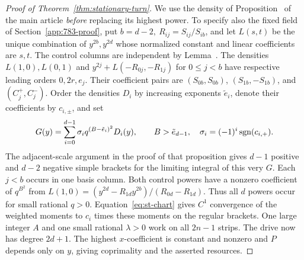 \begin{proof}[Proof of Theorem~\ref{thm:stationary-turn}]
We use the density of Proposition~ of the main article \emph{before} replacing its highest power. To specify also the fixed field of Section~\ref{app:783-proof}, put \(b=d-2,\ R_{ij}=S_{ij}/S_{ib}\), and let \(L(s,t)\) be the unique combination of \(y^{2b},y^{2d}\) whose normalized constant and linear coefficients are \(s,t\). The control columns are independent by Lemma~. The densities \(L(1,0),L(0,1)\) and \(y^{2j}+L(-R_{0j},-R_{1j})\) for \(0\le j<b\) have respective leading orders \(0,2r,e_j\). Their coefficient pairs are \((S_{0b},S_{0b})\), \((S_{1b},-S_{1b})\), and \((C_j^+,C_j^-)\). Order the densities \(D_i\) by increasing exponents \(\tilde e_i\), denote their coefficients by \(c_{i,\pm}\), and set
\begin{equation}\label{eq:st-choice}
 G(y)=\sum_{i=0}^{d-1}\sigma_i q^{(B-\tilde e_i)^2}D_i(y),
 \qquad B>\tilde e_{d-1},\quad \sigma_i=(-1)^i\operatorname{sgn}(c_{i,+}).
\end{equation}
The adjacent-scale argument in the proof of that proposition gives \(d-1\) positive and \(d-2\) negative simple brackets for the limiting integral of this very \(G\). Each \(j<b\) occurs in one basis column. Both control powers have a nonzero coefficient of \(q^{B^2}\) from \(L(1,0)=(y^{2d}-R_{1d}y^{2b})/(R_{0d}-R_{1d})\). Thus all \(d\) powers occur for small rational \(q>0\). Equation~\eqref{eq:st-chart} gives \(C^1\) convergence of the weighted moments to \(c_i\) times these moments on the regular brackets. One large integer \(A\) and one small rational \(\lambda>0\) work on all \(2n-1\) strips. The drive now has degree \(2d+1\). The highest \(x\)-coefficient is constant and nonzero and \(P\) depends only on \(y\), giving coprimality and the asserted resources.
\end{proof}
